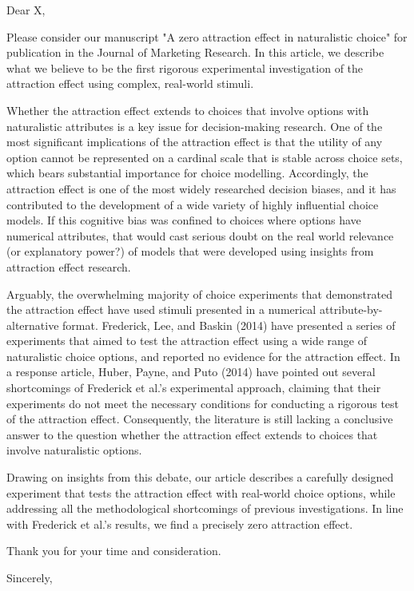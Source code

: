 \documentclass{letter}
\begin{document}
\begin{letter}
{}
\opening{Dear X,}


Please consider our manuscript "A zero attraction effect in naturalistic choice" for publication in the Journal of Marketing Research. In this article, we describe what we believe to be the first rigorous experimental investigation of the attraction effect using complex, real-world stimuli. 

Whether the attraction effect extends to choices that involve options with naturalistic attributes is a key issue for decision-making research. One of the most significant implications of the attraction effect is that the utility of any option cannot be represented on a cardinal scale that is stable across choice sets, which bears substantial importance for choice modelling. Accordingly, the attraction effect is one of the most widely researched decision biases, and it has contributed to the development of a wide variety of highly influential choice models. If this cognitive bias was confined to choices where options have numerical attributes, that would cast serious doubt on the real world relevance (or explanatory power?) of models that were developed using insights from attraction effect research.

Arguably, the overwhelming majority of choice experiments that demonstrated the attraction effect have used stimuli presented in a numerical attribute-by-alternative format. Frederick, Lee, and Baskin (2014) have presented a series of experiments that aimed to test the attraction effect using a wide range of naturalistic choice options, and reported no evidence for the attraction effect. In a response article, Huber, Payne, and Puto (2014) have pointed out several shortcomings of Frederick et al.'s experimental approach, claiming that their experiments do not meet the necessary conditions for conducting a rigorous test of the attraction effect. Consequently, the literature is still lacking a conclusive answer to the question whether the attraction effect extends to choices that involve naturalistic options.

Drawing on insights from this debate, our article describes a carefully designed experiment that tests the attraction effect with real-world choice options, while addressing all the methodological shortcomings of previous investigations. In line with Frederick et al.'s results, we find a precisely zero attraction effect.


Thank you for your time and consideration.


\closing{Sincerely,}



\end{letter}
\end{document}
